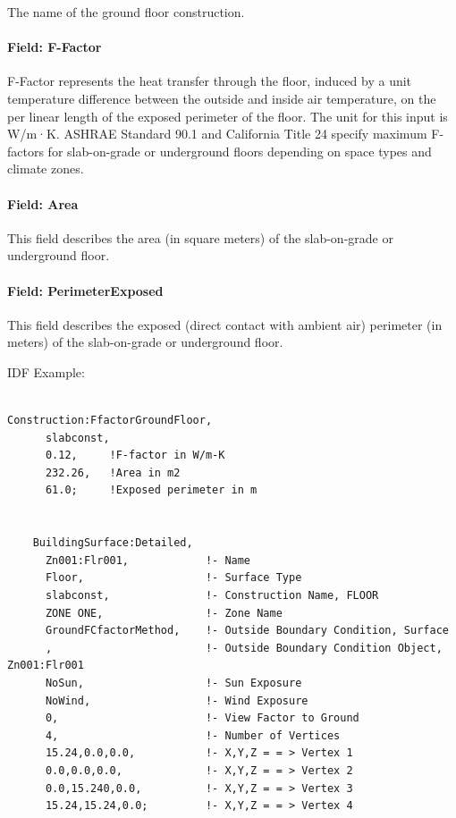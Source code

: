 The name of the ground floor construction.

\paragraph{Field: F-Factor}\label{field-f-factor}

F-Factor represents the heat transfer through the floor, induced by a unit temperature difference between the outside and inside air temperature, on the per linear length of the exposed perimeter of the floor. The unit for this input is W/m·K. ASHRAE Standard 90.1 and California Title 24 specify maximum F-factors for slab-on-grade or underground floors depending on space types and climate zones.

\paragraph{Field: Area}\label{field-area}

This field describes the area (in square meters) of the slab-on-grade or underground floor.

\paragraph{Field: PerimeterExposed}\label{field-perimeterexposed}

This field describes the exposed (direct contact with ambient air) perimeter (in meters) of the slab-on-grade or underground floor.

IDF Example:

\begin{lstlisting}

Construction:FfactorGroundFloor,
      slabconst,
      0.12,     !F-factor in W/m-K
      232.26,   !Area in m2
      61.0;     !Exposed perimeter in m


    BuildingSurface:Detailed,
      Zn001:Flr001,            !- Name
      Floor,                   !- Surface Type
      slabconst,               !- Construction Name, FLOOR
      ZONE ONE,                !- Zone Name
      GroundFCfactorMethod,    !- Outside Boundary Condition, Surface
      ,                        !- Outside Boundary Condition Object, Zn001:Flr001
      NoSun,                   !- Sun Exposure
      NoWind,                  !- Wind Exposure
      0,                       !- View Factor to Ground
      4,                       !- Number of Vertices
      15.24,0.0,0.0,           !- X,Y,Z = = > Vertex 1
      0.0,0.0,0.0,             !- X,Y,Z = = > Vertex 2
      0.0,15.240,0.0,          !- X,Y,Z = = > Vertex 3
      15.24,15.24,0.0;         !- X,Y,Z = = > Vertex 4
\end{lstlisting}

